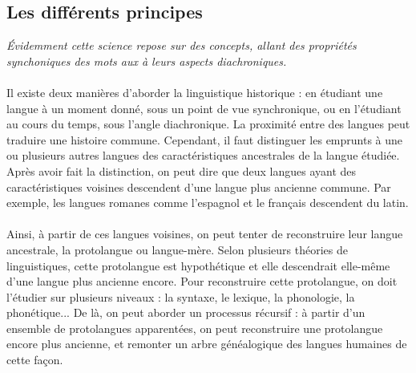 \documentclass[12pt, french, twoside]{report}
\begin{document}
\subsection{Les différents principes} \label{principesLinguistique}
\textit{Évidemment cette science repose sur des concepts, allant des propriétés synchoniques des mots aux à leurs aspects diachroniques.}
\\ \\ 
\indent Il existe deux manières d'aborder la linguistique historique : en étudiant une langue à un moment donné, sous un point de vue synchronique, ou en l'étudiant au cours du temps, sous l'angle diachronique. La proximité entre des langues peut traduire une histoire commune. Cependant, il faut distinguer les emprunts à une ou plusieurs autres langues des caractéristiques ancestrales de la langue étudiée. Après avoir fait la distinction, on peut dire que deux langues ayant des caractéristiques voisines descendent d'une langue plus ancienne commune. Par exemple, les langues romanes comme l'espagnol et le français descendent du latin. \\ \\ 
\indent Ainsi, à partir de ces langues voisines, on peut tenter de reconstruire leur langue ancestrale, la protolangue ou langue-mère. Selon plusieurs théories de linguistiques, cette protolangue est hypothétique et elle descendrait elle-même d'une langue plus ancienne encore.
Pour reconstruire cette protolangue, on doit l'étudier sur plusieurs niveaux : la syntaxe, le lexique, la phonologie, la phonétique... De là, on peut aborder un processus récursif : à partir d'un ensemble de protolangues apparentées, on peut reconstruire une protolangue encore plus ancienne, et remonter un arbre généalogique des langues humaines de cette façon.
\end{document}
